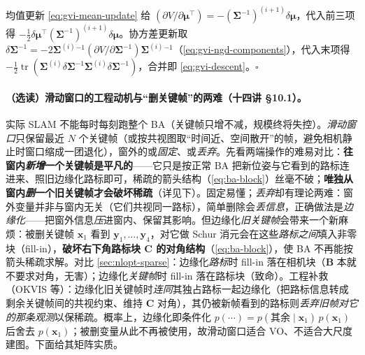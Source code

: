 \begin{derivation}
\[\]
均值更新 \cref{eq:gvi-mean-update} 给 $(\partial V/\partial\boldsymbol{\mu}^\top)=-(\boldsymbol{\Sigma}^{-1})^{(i+1)}\delta\boldsymbol{\mu}$，代入前三项得 $-\tfrac12\delta\boldsymbol{\mu}^\top(\boldsymbol{\Sigma}^{-1})^{(i+1)}\delta\boldsymbol{\mu}$。协方差更新取 $\delta\boldsymbol{\Sigma}^{-1}=-2\boldsymbol{\Sigma}^{(i)}{}^{-1}(\partial V/\partial\boldsymbol{\Sigma}^{-1})\boldsymbol{\Sigma}^{(i)}{}^{-1}$（\cref{eq:gvi-ngd-components}），代入末项得 $-\tfrac12\operatorname{tr}(\boldsymbol{\Sigma}^{(i)}\delta\boldsymbol{\Sigma}^{-1}\boldsymbol{\Sigma}^{(i)}\delta\boldsymbol{\Sigma}^{-1})$，合并即 \cref{eq:gvi-descent}。\hfill$\square$
\end{derivation}

\paragraph{（选读）滑动窗口的工程动机与“删关键帧”的两难（十四讲 §10.1）。}\cite{gaoxiang2019slam14}
实际 SLAM 不能每时每刻跑整个 BA（关键帧只增不减，规模终将失控）。\emph{滑动窗口}只保留最近 $N$ 个关键帧（或按共视图取“时间近、空间散开”的帧，避免相机静止时窗口缩成一团退化），窗外的或\emph{固定}、或\emph{丢弃}。先看两端操作的难易对比\cite{gaoxiang2019slam14}：\textbf{往窗内\emph{新增}一个关键帧是平凡的}——它只是按正常 BA 把新位姿与它看到的路标连进来、照旧边缘化路标即可，稀疏的箭头结构（\cref{eq:ba-block}）丝毫不破；\textbf{唯独从窗内\emph{删}一个旧关键帧才会破坏稀疏}（详见下）。固定易懂；\emph{丢弃}却有理论两难：窗外变量并非与窗内无关（它们共视同一路标），简单删除会\emph{丢信息}，正确做法是\emph{边缘化}——把窗外信息\emph{压}进窗内、保留其影响。但边缘化\emph{旧关键帧}会带来一个新麻烦：被删关键帧 $\mathbf{x}_1$ 看到 $\mathbf{y}_1,\dots,\mathbf{y}_4$，对它做 Schur 消元会在这些\emph{路标之间}填入非零块（fill-in），\textbf{破坏右下角路标块 $\mathbf{C}$ 的对角结构}（\cref{eq:ba-block}），使 BA 不再能按箭头稀疏求解。对比 \cref{sec:nlopt-sparse}：边缘化\emph{路标}时 fill-in 落在相机块（$\mathbf{B}$ 本就不要求对角，无害）；边缘化\emph{关键帧}时 fill-in 落在路标块（致命）。工程补救（OKVIS\cite{leutenegger2015okvis} 等）：边缘化旧关键帧时\emph{连同}其独占路标一起边缘化（把路标信息转成剩余关键帧间的共视约束、维持 $\mathbf{C}$ 对角），其仍被新帧看到的路标则\emph{丢弃旧帧对它的那条观测}以保稀疏。概率上，边缘化即条件化 $p(\cdots)=p(\text{其余}\mid\mathbf{x}_1)\,p(\mathbf{x}_1)$ 后舍去 $p(\mathbf{x}_1)$；被删变量从此不再被使用，故滑动窗口适合 VO、不适合大尺度建图。下面给其矩阵实质。

